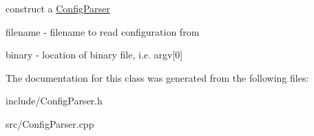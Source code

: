 construct a \hyperlink{classConfigParser}{Config\+Parser} \begin{DoxyItemize}
\item {\ttfamily filename} -\/ filename to read configuration from \item {\ttfamily binary} -\/ location of binary file, i.\+e. argv\mbox{[}0\mbox{]} \end{DoxyItemize}


The documentation for this class was generated from the following files\+:\begin{DoxyCompactItemize}
\item 
include/Config\+Parser.\+h\item 
src/Config\+Parser.\+cpp\end{DoxyCompactItemize}
